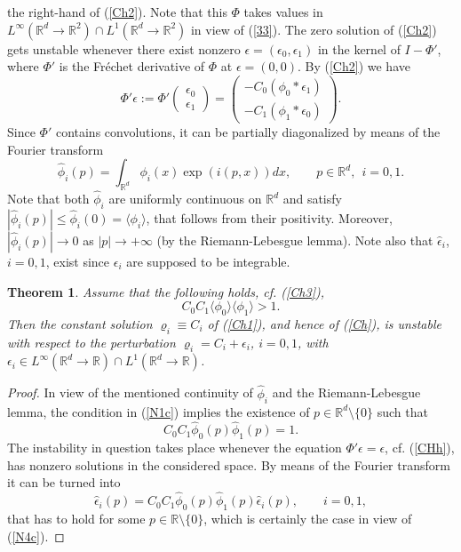 \documentclass[reqno,11pt]{amsart}
\newtheorem{theorem}{Theorem}[section]
\theoremstyle{definition}
\theoremstyle{remark}
\numberwithin{equation}{section}
\begin{document}
the right-hand of (\ref{Ch2}). Note that this $\Phi$ takes values in
$L^\infty (\mathds{R}^d\to \mathds{R}^2)\cap L^1 (\mathds{R}^d\to
\mathds{R}^2) $ in view of (\ref{33}). The zero solution of
(\ref{Ch2}) gets unstable whenever there exist nonzero $\epsilon =
(\epsilon_0, \epsilon_1)$ in the kernel of $I- \Phi'$, where $\Phi'$
is the Fr{\'e}chet derivative of $\Phi$ at $\epsilon = (0,0)$. By
(\ref{Ch2}) we have
\begin{equation}
  \label{CHh}
\Phi' \epsilon:= \Phi' \left(\!\begin{array}{ll} \epsilon_0\\[.2cm] \epsilon_1
\end{array} \!
\right) = \left(\!\begin{array}{ll} - C_0(\phi_0 \ast\epsilon_1)\\[.2cm] - C_1(\phi_1 \ast \epsilon_0)  \end{array}
\!\right).
\end{equation}
Since $\Phi'$ contains convolutions, it can be partially
diagonalized by means of the Fourier transform
\[
\hat{\phi}_i (p)= \int_{\mathds{R}^d} \phi_i (x) \exp\left(i
(p,x)\right)d x, \qquad p\in \mathds{R}^d, \ \ i=0,1.
\]
Note that both $\hat{\phi}_i$ are uniformly continuous on
$\mathds{R}^d$ and satisfy $|\hat{\phi}_i(p)| \leq \hat{\phi}_i(0) =
\langle \phi_i \rangle$, that  follows from their positivity.
Moreover, $|\hat{\phi}_i(p)| \to 0$ as $|p|\to +\infty$ (by the
Riemann-Lebesgue lemma). Note also that $\hat{\epsilon}_i$, $i=0,1$,
exist since $\epsilon_i$ are supposed to be integrable.
\begin{theorem}
  \label{K2tm}
Assume that the following holds, cf. (\ref{Ch3}),
\begin{equation}
  \label{N1c}
C_0 C_1 \langle \phi_0 \rangle \langle \phi_1 \rangle > 1.
\end{equation}
Then the constant solution $\varrho_i\equiv C_i$ of (\ref{Ch1}), and
hence of (\ref{Ch}), is unstable with respect to the perturbation
$\varrho_i = C_i + \epsilon_i$, $i=0,1$, with $\epsilon_i \in
L^\infty (\mathds{R}^d\to \mathds{R})\cap  L^1 (\mathds{R}^d\to
\mathds{R})$.
\end{theorem}
\begin{proof}
In view of the mentioned continuity of $\hat{\phi}_i$ and the
Riemann-Lebesgue lemma, the condition in (\ref{N1c}) implies the
existence of $p\in \mathds{R}^d\setminus \{0\}$ such that
\begin{equation}
  \label{N4c}
C_0 C_1 \hat{\phi}_0 (p) \hat{\phi}_1 (p) =1 .
\end{equation}
The instability in question takes place whenever the equation $\Phi'
\epsilon
 = \epsilon$, cf. (\ref{CHh}), has nonzero solutions in the
considered space. By means of the Fourier transform it can be turned
into
\begin{equation}
  \label{MNM}
\hat{\epsilon}_i (p) = C_0 C_1 \hat{\phi}_0 (p) \hat{\phi}_1 (p)
\hat{\epsilon}_i (p) , \qquad i=0,1,
\end{equation}
that has to hold for some $p\in \mathds{R}\setminus \{0\}$, which is
certainly the case in view of (\ref{N4c}).
\end{proof}
\end{document}

